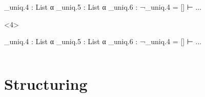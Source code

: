 \begin{frame}[fragile]
\begin{columns}[onlytextwidth]
\begin{column}{.5\textwidth}
\begin{onlyenv}
\begin{leancode}[highlightlines=2]
          _uniq.4 : List α
          _uniq.5 : List α
          _uniq.6 : ¬_uniq.4 = []
          ⊢ ...
        \end{leancode}
      \end{onlyenv}
      \begin{onlyenv}<4>
        \begin{leancode}[highlightlines=3]
          _uniq.4 : List α
          _uniq.5 : List α
          _uniq.6 : ¬_uniq.4 = []
          ⊢ ...
        \end{leancode}
      \end{onlyenv}
    \end{column}
  \end{columns}

  \bigskip

  \begin{center}
  \end{center}
\end{frame}

\section{Structuring}

